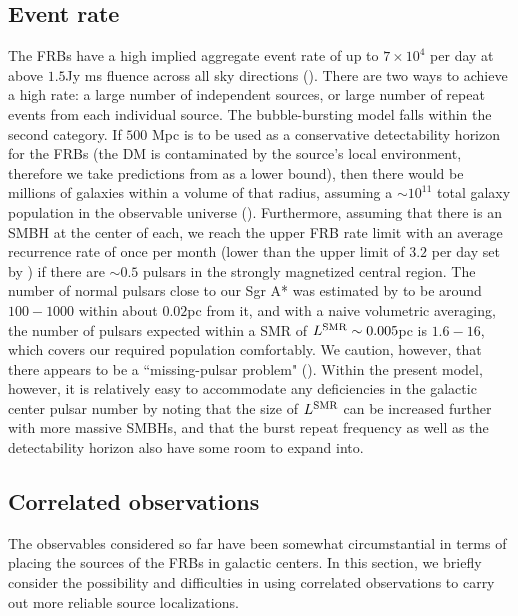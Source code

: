 \documentclass{aa}
\begin{document}
\subsection{Event rate} \label{sec:EventRate}
The FRBs have a high implied aggregate event rate of up to $7\times 10^4$ per day at above $1.5$Jy ms fluence across all sky directions (\cite{2015ApJ...807...16L}). There are two ways to achieve a high rate: a large number of independent sources, or large number of repeat events from each individual source. 
The bubble-bursting model falls within the second category. If $500 $ Mpc is to be used as a conservative detectability horizon for the FRBs (the DM is contaminated by the source's local environment, therefore we take predictions from \cite{2015ApJ...807..179P} as a lower bound), 
then there would be millions of galaxies within a volume of that radius, assuming a $\sim 10^{11}$ total galaxy population in the observable universe (\cite{2005ApJ...624..463G}). Furthermore, assuming that there is an SMBH at the center of each, we reach the upper FRB rate limit with an average recurrence rate of once per month 
(lower than the upper limit of $3.2$ per day set by \cite{2015ApJ...807...16L})
if there are $\sim 0.5$ pulsars in the strongly magnetized central region. The number of normal pulsars close to our Sgr A* was estimated by \cite{2004ApJ...615..253P} to be around $100-1000$ within about $0.02$pc from it,
and with a naive volumetric averaging, the number of pulsars expected within a SMR of $L^{\rm SMR}\sim 0.005$pc is $1.6-16$, which covers our required population comfortably. We caution, however, that there appears to be a ``missing-pulsar problem" (\cite{2010ApJ...715..939M,2014ApJ...783L...7D}). 
Within the present model, however, it is relatively easy to accommodate any deficiencies in the galactic center pulsar number by noting that the size of $L^{\rm SMR}$ can be increased further with more massive SMBHs, and that the burst repeat frequency as well as the detectability horizon also have some room to expand into. 

\subsection{Correlated observations}
The observables considered so far have been somewhat circumstantial in terms of placing the sources of the FRBs in galactic centers. In this section, we briefly consider the possibility and difficulties in using correlated observations to carry out more reliable source localizations. 
\end{document}
